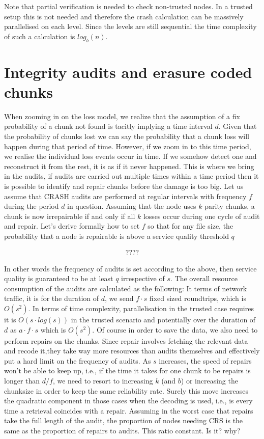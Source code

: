 \documentclass[12pt]{article}
\begin{document}
Note that partial verification is needed to check non-trusted nodes. In a trusted setup this is not needed and therefore the crash calculation can be massively parallelised on each level. Since the levels are still sequential the time complexity of such a calculation is $log_{b}(n)$.

\section{Integrity audits and erasure coded chunks}

When zooming in on the loss model, we realize that the assumption of a fix probability of a chunk not found is tacitly implying a time interval $d$. Given that the probability of chunks lost we can say the probability that a chunk loss will happen during that period of time. However, if we zoom in to this time period, we realise the individual loss events occur in time. If we somehow detect one and reconstruct it from the rest, it is as if it never happened. This is where we bring in the audits, if audits are carried out multiple times within a time period then it is possible to identify and repair chunks before the damage is too big.
Let us assume that CRASH audits are performed at regular intervals with frequency $f$ during the period $d$ in question. Assuming that the node uses $k$ parity chunks,  a chunk is now irrepairable if and only if all $k$ losses occur during one cycle of audit and repair. Let's derive formally how to set $f$ so that for any file size, the probability that a node is repairable is above a service quality threshold $q$

\begin{align*}
????
\end{align*}

In other words the frequency of audits is set according to the above, then service quality is guaranteed to be at least $q$ irrespective of $s$. The overall resource consumption of the audits are calculated as the following:
It terms of network traffic, it is for the duration of $d$, we send $f\cdot s$ fixed sized roundtrips, which is $O(s^2)$. In terms of time complexity, parallelisation in the trusted case requires it is $O(s\cdot log(s))$ in the trusted scenario and potentially
over the duration of $d$ as $a\cdot f\cdot s$ which is $O(s^2)$.
Of course in order to save the data, we also need to perform repairs on the chunks. Since repair involves fetching the relevant data and recode it,they take way more resources than audits themselves and effectively put a hard limit on the frequency of audits.
As $s$ increases, the speed of repairs won't be able to keep up, i.e., if the time it takes for one chunk to be repairs is longer than $d/f$, we need to resort to increasing $k$ (and $b$) or increasing the chunksize in order to keep the same reliability rate.
Surely this move increases the quadratic component in those cases when the decoding is used, i.e., is every time a retrieval coincides with a repair. Assuming in the worst case that repairs take the full length of the audit, the proportion of nodes needing CRS is the same as the proportion of repairs to audits. This ratio constant. Is it? why?
\end{document}
